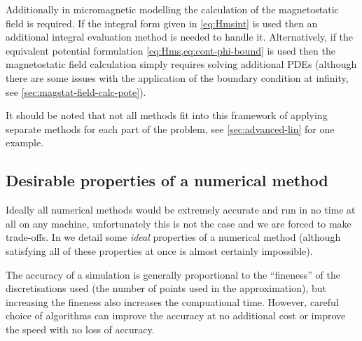 Additionally in micromagnetic modelling the calculation of the magnetostatic field is required.
If the integral form given in \cref{eq:Hmsint} is used then an additional integral evaluation method is needed to handle it.
Alternatively, if the equivalent potential formulation \cref{eq:Hms,eq:cont-phi-bound} is used then the magnetostatic field calculation simply requires solving additional PDEs (although there are some issues with the application of the boundary condition at infinity, see \cref{sec:magstat-field-calc-pote}).

It should be noted that not all methods fit into this framework of applying separate methods for each part of the problem, see \cref{sec:advanced-lin} for one example.



\subsection{Desirable properties of a numerical method}

Ideally all numerical methods would be extremely accurate and run in no time at all on any machine, unfortunately this is not the case and we are forced to make trade-offs.
In  we detail some \emph{ideal} properties of a numerical method (although satisfying all of these properties at once is almost certainly impossible).


The accuracy of a simulation is generally proportional to the ``fineness''  of the discretisations used (\ie the number of points used in the approximation), but increasing the fineness also increases the compuational time.
However, careful choice of algorithms can improve the accuracy at no additional cost or improve the speed with no loss of accuracy.

